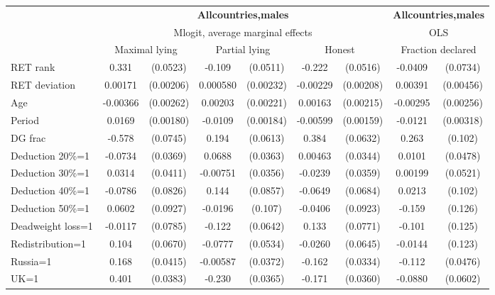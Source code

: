 \begin{tabular}{l|cccccc|cc}
\hline\hline
&\multicolumn{6}{c|}{\bf All\space{}countries,\space{}males}&\multicolumn{2}{c}{\bf All\space{}countries,\space{}males}\\ &\multicolumn{6}{c|}{Mlogit, average marginal effects }&\multicolumn{2}{c}{OLS}\\
                &\multicolumn{2}{c}{Maximal lying}&\multicolumn{2}{c}{Partial lying}&\multicolumn{2}{c}{Honest}  &\multicolumn{2}{c}{Fraction declared}\\
\hline
RET rank        &    0.331\sym{***}& (0.0523)&   -0.109\sym{**} & (0.0511)&   -0.222\sym{***}& (0.0516)&  -0.0409         & (0.0734)\\
RET deviation   &  0.00171         &(0.00206)& 0.000580         &(0.00232)& -0.00229         &(0.00208)&  0.00391         &(0.00456)\\
Age             & -0.00366         &(0.00262)&  0.00203         &(0.00221)&  0.00163         &(0.00215)& -0.00295         &(0.00256)\\
Period          &   0.0169\sym{***}&(0.00180)&  -0.0109\sym{***}&(0.00184)& -0.00599\sym{***}&(0.00159)&  -0.0121\sym{***}&(0.00318)\\
DG frac         &   -0.578\sym{***}& (0.0745)&    0.194\sym{***}& (0.0613)&    0.384\sym{***}& (0.0632)&    0.263\sym{**} &  (0.102)\\
Deduction 20\%=1&  -0.0734\sym{**} & (0.0369)&   0.0688\sym{*}  & (0.0363)&  0.00463         & (0.0344)&   0.0101         & (0.0478)\\
Deduction 30\%=1&   0.0314         & (0.0411)& -0.00751         & (0.0356)&  -0.0239         & (0.0359)&  0.00199         & (0.0521)\\
Deduction 40\%=1&  -0.0786         & (0.0826)&    0.144\sym{*}  & (0.0857)&  -0.0649         & (0.0684)&   0.0213         &  (0.102)\\
Deduction 50\%=1&   0.0602         & (0.0927)&  -0.0196         &  (0.107)&  -0.0406         & (0.0923)&   -0.159         &  (0.126)\\
Deadweight loss=1&  -0.0117         & (0.0785)&   -0.122\sym{*}  & (0.0642)&    0.133\sym{*}  & (0.0771)&   -0.101         &  (0.125)\\
Redistribution=1&    0.104         & (0.0670)&  -0.0777         & (0.0534)&  -0.0260         & (0.0645)&  -0.0144         &  (0.123)\\
Russia=1        &    0.168\sym{***}& (0.0415)& -0.00587         & (0.0372)&   -0.162\sym{***}& (0.0334)&   -0.112\sym{**} & (0.0476)\\
UK=1            &    0.401\sym{***}& (0.0383)&   -0.230\sym{***}& (0.0365)&   -0.171\sym{***}& (0.0360)&  -0.0880         & (0.0602)\\

\end{tabular}
